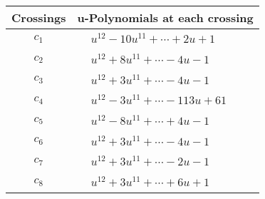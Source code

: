 \documentclass[1p]{elsarticle_modified}
\theoremstyle{definition}
\begin{document}
\begin{tabular}{m{50pt}|m{274pt}}
Crossings & \hspace{64pt}u-Polynomials at each crossing \\
\hline $$\begin{aligned}c_{1}\end{aligned}$$&$\begin{aligned}
&u^{12}-10 u^{11}+\cdots+2 u+1
\end{aligned}$\\
\hline $$\begin{aligned}c_{2}\end{aligned}$$&$\begin{aligned}
&u^{12}+8 u^{11}+\cdots-4 u-1
\end{aligned}$\\
\hline $$\begin{aligned}c_{3}\end{aligned}$$&$\begin{aligned}
&u^{12}+3 u^{11}+\cdots-4 u-1
\end{aligned}$\\
\hline $$\begin{aligned}c_{4}\end{aligned}$$&$\begin{aligned}
&u^{12}-3 u^{11}+\cdots-113 u+61
\end{aligned}$\\
\hline $$\begin{aligned}c_{5}\end{aligned}$$&$\begin{aligned}
&u^{12}-8 u^{11}+\cdots+4 u-1
\end{aligned}$\\
\hline $$\begin{aligned}c_{6}\end{aligned}$$&$\begin{aligned}
&u^{12}+3 u^{11}+\cdots-4 u-1
\end{aligned}$\\
\hline $$\begin{aligned}c_{7}\end{aligned}$$&$\begin{aligned}
&u^{12}+3 u^{11}+\cdots-2 u-1
\end{aligned}$\\
\hline $$\begin{aligned}c_{8}\end{aligned}$$&$\begin{aligned}
&u^{12}+3 u^{11}+\cdots+6 u+1
\end{aligned}$\\

\end{tabular}
\end{document}
